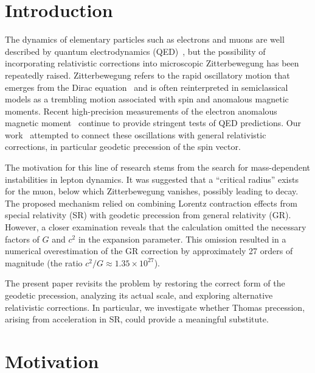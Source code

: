 \documentclass[%
 reprint,
 amsmath,amssymb,
 aps,
]{revtex4-1}
\numberwithin{equation}{section}
\begin{document}
\section{Introduction}

The dynamics of elementary particles such as electrons and muons are well described by quantum electrodynamics (QED)~\cite{schwinger1948}, but the possibility of incorporating relativistic corrections into microscopic Zitterbewegung has been repeatedly raised. 
Zitterbewegung refers to the rapid oscillatory motion that emerges from the Dirac equation~\cite{dirac1928,zitterbewegung1930} and is often reinterpreted in semiclassical models as a trembling motion associated with spin and anomalous magnetic moments. Recent high-precision measurements of the electron anomalous magnetic moment~\cite{fan2023} continue to provide stringent tests of QED predictions. Our work~\cite{zenodo.16905633} attempted to connect these oscillations with general relativistic corrections, in particular geodetic precession of the spin vector.

The motivation for this line of research stems from the search for mass-dependent instabilities in lepton dynamics. It was suggested that a ``critical radius'' exists for the muon, below which Zitterbewegung vanishes, possibly leading to decay. The proposed mechanism relied on combining Lorentz contraction effects from special relativity (SR) with geodetic precession from general relativity (GR). However, a closer examination reveals that the calculation omitted the necessary factors of $G$ and $c^2$ in the expansion parameter. This omission resulted in a numerical overestimation of the GR correction by approximately 27 orders of magnitude (the ratio $c^2/G \approx 1.35 \times 10^{27}$).

The present paper revisits the problem by restoring the correct form of the geodetic precession, analyzing its actual scale, and exploring alternative relativistic corrections. 
In particular, we investigate whether Thomas precession, arising from acceleration in SR, 
could provide a meaningful substitute.

\section{Motivation}\label{sec:motivation}
\end{document}
